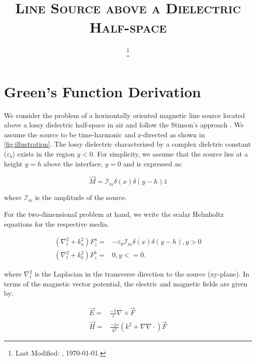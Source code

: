 \documentclass{article}
\begin{document}
  \title{\textsc{Line Source above a Dielectric Half-space}\\}
  \date{\footnote{Last Modified: \currenttime, \today.}}
  \maketitle
\section{Green's Function Derivation}
  We consider the problem of a horizontally oriented magnetic line source located above a lossy dielectric half-space in air and follow the Stinson's approach \cite{stinson1976intermediate}. We assume the source to be time-harmonic and z-directed as shown in \ref{fig:illustration}. The lossy dielectric characterized by a complex dielctric constant ($\varepsilon_b$) exists in the region $y < 0$. For simplicity, we assume that the source lies at a height $y = h$ above the interface, $y = 0$ and is expressed as:

  \begin{equation}
    \overrightarrow{M} = \mathcal{I}_m \delta(x) \delta(y -h) \widehat{z}
    \label{eq:Current}
  \end{equation}

  where $\mathcal{I}_m$ is the amplitude of the source.

  For the two-dimensional problem at hand, we write the scalar Helmholtz equations for the respective media.

  \begin{subequations}
    \begin{align}
      \left( \nabla_t^2 + k_a^2 \right) F_z^a ={}& -\varepsilon_0 \mathcal{I}_m  \delta(x) \delta(y - h), y > 0
      \label{eq:Hemup} \\
      \left( \nabla_t^2 + k_b^2 \right) F_z^b ={}& 0,     y <= 0
      \label{eq:Hemdn}.
    \end{align}
    \label{Hem}
  \end{subequations}

  where $\nabla_t^2$ is the Laplacian in the transverse direction to the source (xy-plane). In terms of the magnetic vector potential, the electric and magnetic fields are given by:

  \begin{subequations}
    \begin{align}
      \overrightarrow{E}  ={}& \frac{-1}{\varepsilon} \nabla \times \overrightarrow{F}
      \label{eq:E} \\
      \overrightarrow{H}  ={}& \frac{-j\omega}{k^2} \left( k^2 + \nabla \nabla \cdot \right) \overrightarrow{F}
      \label{eq:H}
    \end{align}
  \end{subequations}
\end{document}
